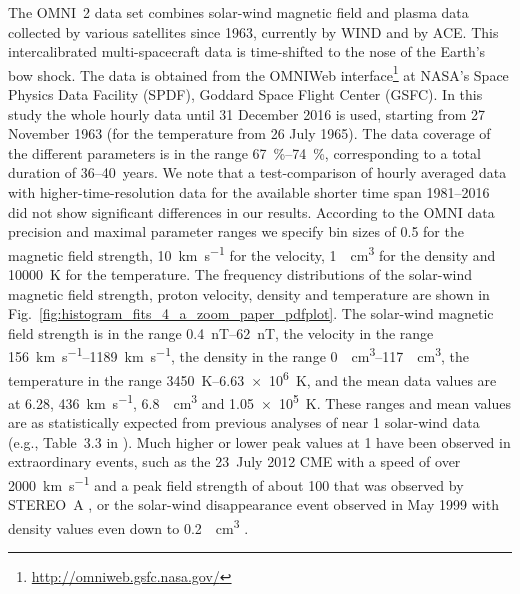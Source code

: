 \documentclass[]{aa}
\begin{document}
        The OMNI~2 data set \citep{King2005} combines solar-wind magnetic field and plasma data collected by various satellites since 1963, currently by WIND and by ACE. This intercalibrated multi-spacecraft data is time-shifted to the nose of the Earth’s bow shock. The data is obtained from the OMNIWeb interface\footnote{\url{http://omniweb.gsfc.nasa.gov/}} at NASA's Space Physics Data Facility (SPDF), Goddard Space Flight Center (GSFC).
        In this study the whole hourly data until 31 December 2016 is used, starting from 27 November 1963 (for the temperature from 26 July 1965). The data coverage of the different parameters is in the range \SIrange{67}{74}{\percent},  corresponding to a total duration of 36--40~years.
        We note that a test-comparison of hourly averaged data with higher-time-resolution data for the available shorter time span 1981--2016 did not show significant differences in our results.        According to the OMNI data precision and maximal parameter ranges we specify bin sizes of \SI{0.5}{\nT} for the magnetic field strength, \SI{10}{\km\per\s} for the velocity, \SI{1}{\per\cm\cubed} for the density and \SI{10000}{\K} for the temperature. The frequency distributions of the solar-wind magnetic field strength, proton velocity, density and temperature are shown in Fig.~\ref{fig:histogram_fits_4_a_zoom_paper_pdfplot}.
        The solar-wind magnetic field strength is in the range \SIrange{0.4}{62}{nT}, the velocity in the range \SIrange{156}{1189}{\km\per\s}, the density in the range \SIrange{0}{117}{\per\cm\cubed}, the temperature in the range \SIrange{3450}{6.63e6}{\K}, and the mean data values are at \SI{6.28}{\nT}, \SI{436}{\km\per\s}, \SI{6.8}{\per\cm\cubed} and \SI{1.05e5}{\K}. These ranges and mean values are as statistically expected from previous analyses of near \SI{1}{\au} solar-wind data (e.g., Table~3.3 in \citet[p.~39]{Bothmer2007}).
        Much higher or lower peak values at \SI{1}{\au} have been observed in extraordinary events, such as the 23~July 2012 CME with a speed of over \SI{2000}{\km\per\s} and a peak field strength of about \SI{100}{\nT} that was observed by STEREO~A \citep{Russell2013}, or the solar-wind disappearance event observed in May 1999 with density values even down to \SI{0.2}{\per\cm\cubed} \citep{Lazarus2000}.
\end{document}
